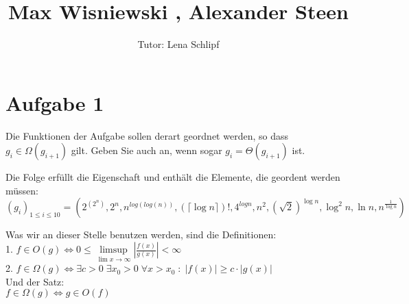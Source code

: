 \documentclass[11pt,a4paper,ngerman]{article}
\author{Tutor: Lena Schlipf}
\date{}
\title{Max Wisniewski , Alexander Steen}
\begin{document}

\maketitle
\thispagestyle{fancy}



\section*{Aufgabe 1}

Die Funktionen der Aufgabe sollen derart geordnet werden, so dass $ g_i \in \Omega (g_{i+1}) $ gilt. Geben Sie auch an, wenn sogar $ g_i = \Theta (g_{i+1}) $ ist. 

\vspace{12px}

Die Folge erfüllt die Eigenschaft und enthält die Elemente, die geordent werden müssen:\\


$$(g_i)_{1 \leq i \leq 10} = (2^{(2^n)}, 2^n  ,  n^{log{(log{(n)})}}, (\lceil \log{n} \rceil)!,  4^{log{n}} ,  n^2 ,  (\sqrt{2})^{\log{n}}  , \log^2{n}  ,  \ln{n}, n^{\frac{1}{\log{n}}})$$

Was wir an dieser Stelle benutzen werden, sind die Definitionen:\\

1. $f \in O (g) \Leftrightarrow 0 \leq \underset{\lim x \rightarrow \infty}{\limsup} \left| \frac{f(x)}{g(x)} \right| < \infty$\\
2. $f \in \Omega (g) \Leftrightarrow \exists c > 0 \; \exists x_0 > 0\; \forall x > x_0 \; : \; \left| f(x) \right| \geq c \cdot \left| g(x) \right|$\\

Und der Satz:\\

$f \in \Omega (g) \Leftrightarrow g \in O (f)$\\
\end{document}
